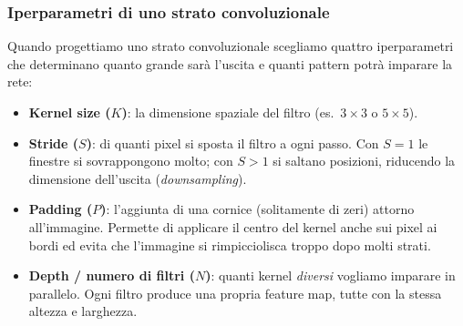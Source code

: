 \documentclass[12pt]{extarticle}
\begin{document}
\subsubsection{Iperparametri di uno strato convoluzionale}

\noindent Quando progettiamo uno strato convoluzionale scegliamo quattro iperparametri che determinano quanto grande sarà l'uscita e quanti pattern potrà imparare la rete:

\begin{itemize}
    \item \textbf{Kernel size ($K$)}: la dimensione spaziale del filtro (es.\ $3\times 3$ o $5\times 5$).
    \item \textbf{Stride ($S$)}: di quanti pixel si sposta il filtro a ogni passo. Con $S=1$ le finestre si sovrappongono molto; con $S>1$ si saltano posizioni, riducendo la dimensione dell'uscita (\emph{downsampling}).
    \item \textbf{Padding ($P$)}: l'aggiunta di una cornice (solitamente di zeri) attorno all'immagine. Permette di applicare il centro del kernel anche sui pixel ai bordi ed evita che l'immagine si rimpicciolisca troppo dopo molti strati.
    \item \textbf{Depth / numero di filtri ($N$)}: quanti kernel \emph{diversi} vogliamo imparare in parallelo. Ogni filtro produce una propria feature map, tutte con la stessa altezza e larghezza.
\end{itemize}

\begin{center}
\end{center}
\end{document}
